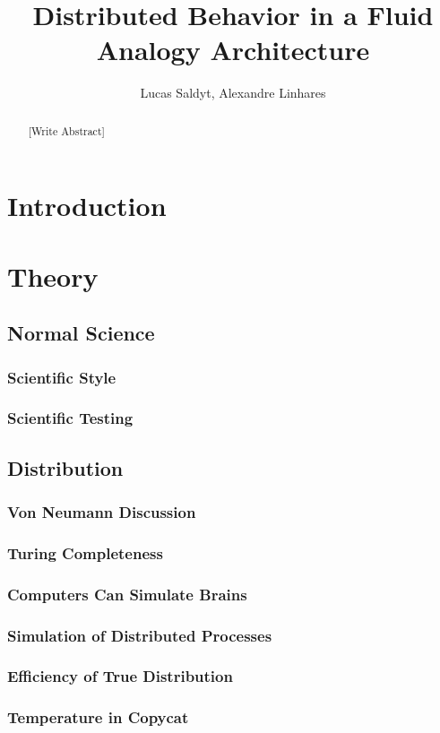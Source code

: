 \documentclass[a4paper]{article}
\title{Distributed Behavior in a Fluid Analogy Architecture}
\author{Lucas Saldyt, Alexandre Linhares}
\begin{document}
\maketitle

\begin{abstract}
    [Write Abstract]
\end{abstract}

\section{Introduction}
\section{Theory}
    \subsection{Normal Science}
        \subsubsection{Scientific Style}
        \subsubsection{Scientific Testing}
    \subsection{Distribution}
        \subsubsection{Von Neumann Discussion}
        \subsubsection{Turing Completeness}
        \subsubsection{Computers Can Simulate Brains}
        \subsubsection{Simulation of Distributed Processes}
        \subsubsection{Efficiency of True Distribution}
        \subsubsection{Temperature in Copycat}
\end{document}
